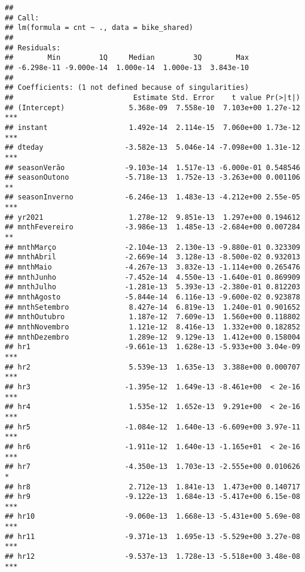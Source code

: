 \documentclass[
]{article}
\begin{document}
\begin{verbatim}
## 
## Call:
## lm(formula = cnt ~ ., data = bike_shared)
## 
## Residuals:
##        Min         1Q     Median         3Q        Max 
## -6.298e-11 -9.000e-14  1.000e-14  1.000e-13  3.843e-10 
## 
## Coefficients: (1 not defined because of singularities)
##                            Estimate Std. Error    t value Pr(>|t|)    
## (Intercept)               5.368e-09  7.558e-10  7.103e+00 1.27e-12 ***
## instant                   1.492e-14  2.114e-15  7.060e+00 1.73e-12 ***
## dteday                   -3.582e-13  5.046e-14 -7.098e+00 1.31e-12 ***
## seasonVerão              -9.103e-14  1.517e-13 -6.000e-01 0.548546    
## seasonOutono             -5.718e-13  1.752e-13 -3.263e+00 0.001106 ** 
## seasonInverno            -6.246e-13  1.483e-13 -4.212e+00 2.55e-05 ***
## yr2021                    1.278e-12  9.851e-13  1.297e+00 0.194612    
## mnthFevereiro            -3.986e-13  1.485e-13 -2.684e+00 0.007284 ** 
## mnthMarço                -2.104e-13  2.130e-13 -9.880e-01 0.323309    
## mnthAbril                -2.669e-14  3.128e-13 -8.500e-02 0.932013    
## mnthMaio                 -4.267e-13  3.832e-13 -1.114e+00 0.265476    
## mnthJunho                -7.452e-14  4.550e-13 -1.640e-01 0.869909    
## mnthJulho                -1.281e-13  5.393e-13 -2.380e-01 0.812203    
## mnthAgosto               -5.844e-14  6.116e-13 -9.600e-02 0.923878    
## mnthSetembro              8.427e-14  6.819e-13  1.240e-01 0.901652    
## mnthOutubro               1.187e-12  7.609e-13  1.560e+00 0.118802    
## mnthNovembro              1.121e-12  8.416e-13  1.332e+00 0.182852    
## mnthDezembro              1.289e-12  9.129e-13  1.412e+00 0.158004    
## hr1                      -9.661e-13  1.628e-13 -5.933e+00 3.04e-09 ***
## hr2                       5.539e-13  1.635e-13  3.388e+00 0.000707 ***
## hr3                      -1.395e-12  1.649e-13 -8.461e+00  < 2e-16 ***
## hr4                       1.535e-12  1.652e-13  9.291e+00  < 2e-16 ***
## hr5                      -1.084e-12  1.640e-13 -6.609e+00 3.97e-11 ***
## hr6                      -1.911e-12  1.640e-13 -1.165e+01  < 2e-16 ***
## hr7                      -4.350e-13  1.703e-13 -2.555e+00 0.010626 *  
## hr8                       2.712e-13  1.841e-13  1.473e+00 0.140717    
## hr9                      -9.122e-13  1.684e-13 -5.417e+00 6.15e-08 ***
## hr10                     -9.060e-13  1.668e-13 -5.431e+00 5.69e-08 ***
## hr11                     -9.371e-13  1.695e-13 -5.529e+00 3.27e-08 ***
## hr12                     -9.537e-13  1.728e-13 -5.518e+00 3.48e-08 ***

\end{verbatim}
\end{document}
